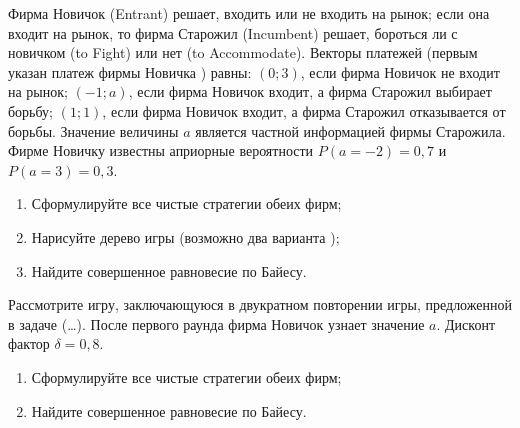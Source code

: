 \begin{problem}
Фирма Новичок (Entrant) решает, входить или не входить на рынок; если она входит на рынок, то фирма Старожил (Incumbent) решает, бороться ли с новичком (to Fight) или нет (to Accommodate). Векторы платежей (первым указан платеж фирмы Новичка ) равны:
$\displaystyle \left(0;3\right)$, если фирма Новичок не входит на рынок;
$\displaystyle \left(-1;a\right)$, если фирма Новичок входит, а фирма Старожил выбирает борьбу;
$\displaystyle \left(1;1\right)$, если фирма Новичок входит, а фирма Старожил отказывается от борьбы.
Значение величины  $a$  является частной информацией фирмы Старожила. Фирме Новичку известны априорные вероятности  $P\left(a=-2\right)=0,7$   и  $P\left(a=3\right)=0,3$.\par
\begin{enumerate}
\item Сформулируйте все чистые стратегии обеих фирм;\par
\item Нарисуйте дерево игры (возможно два варианта );\par
\item  Найдите совершенное равновесие по Байесу.\par
\end{enumerate}


\begin{sol}

\end{sol}
\end{problem}



\begin{problem}
Рассмотрите игру, заключающуюся в двукратном повторении игры, предложенной в задаче (\ldots ). После первого раунда фирма Новичок узнает значение  $a$.
Дисконт фактор  $\delta =0,8$.\par
\begin{enumerate}
\item Сформулируйте все чистые стратегии обеих фирм;\par
\item Найдите совершенное равновесие по Байесу.\par
\end{enumerate}


\begin{sol}

\end{sol}
\end{problem}



